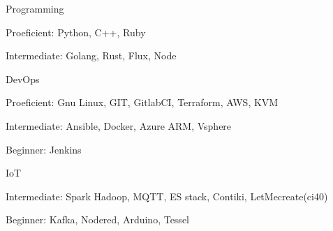 

\begin{cvskills}

  \cvskill
    {Programming}
    {
      \begin{cvitems} %
        \item Proeficient:\hspace{2.5mm} Python, C++, Ruby
        \item Intermediate:              Golang, Rust, Flux, Node
      \end{cvitems}
    }
  \cvskill
    {DevOps} %
    {
      \begin{cvitems} %
        \item Proeficient:\hspace{2.5mm} Gnu Linux, GIT, GitlabCI, Terraform, AWS, KVM
        \item Intermediate:              Ansible, Docker, Azure ARM, Vsphere
        \item Beginner:\hspace{5mm}      Jenkins
      \end{cvitems}
    }

  \cvskill
    {IoT} %
    {
      \begin{cvitems} %
      \item Intermediate:             Spark Hadoop, MQTT, ES stack, Contiki, LetMecreate(ci40)
      \item Beginner:\hspace{5mm}     Kafka, Nodered, Arduino, Tessel
      \end{cvitems}
    }


\end{cvskills}
